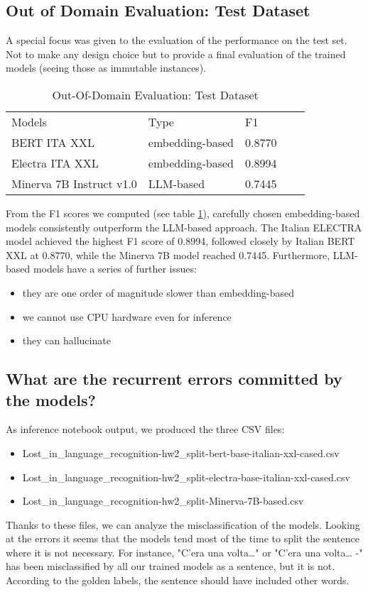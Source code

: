 \documentclass[11pt]{article}
\begin{document}
\subsection{Out of Domain Evaluation: Test Dataset}
A special focus was given to the evaluation of the performance on the test set.
Not to make any design choice but to provide a final evaluation of the 
trained models (seeing those as immutable instances).
\begin{table}[]
	\small
	\caption{Out-Of-Domain Evaluation: Test Dataset}
	\begin{tabular}{lllll}
		Models & Type & F1 \\
		BERT ITA XXL & embedding-based & 0.8770 \\
		Electra ITA XXL & embedding-based & 0.8994 \\
		Minerva 7B Instruct v1.0 & LLM-based & 0.7445 \\
	\end{tabular}
	\label{t3}
\end{table}
From the F1 scores we computed (see table \ref{t3}), carefully chosen embedding-based models consistently outperform the LLM-based approach. \newline The Italian ELECTRA model achieved the highest F1 score of 0.8994, followed closely by Italian BERT XXL at 0.8770, while the Minerva 7B model reached 0.7445. \newline
Furthermore, LLM-based models have a series of further issues:

\begin{itemize}
 	\item they are one order of magnitude slower than embedding-based
	\item we cannot use CPU hardware even for inference
	\item they can hallucinate
\end{itemize}

\subsection{What are the recurrent errors committed by the models?}
As inference notebook output, we produced the three CSV files:
\begin{itemize}
 	\item Lost\_in\_language\_recognition-hw2\_split-bert-base-italian-xxl-cased.csv
	\item Lost\_in\_language\_recognition-hw2\_split-electra-base-italian-xxl-cased.csv
	\item Lost\_in\_language\_recognition-hw2\_split-Minerva-7B-based.csv
\end{itemize}
Thanks to these files, we can analyze the misclassification of the models. \newline Looking at the errors it seems that the models tend most of the time to split the sentence where it is not necessary. \newline For instance, "C'era una volta…" or "C'era una volta… -" has been misclassified by all our trained models as a sentence, but it is not. According to the golden labels, the sentence should have included other words.
 
\end{document}
